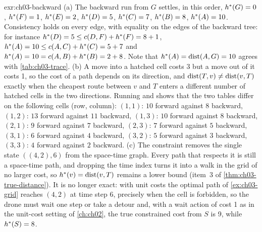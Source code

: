 \begin{solution}{exr:ch03-backward}
(a) The backward run from $G$ settles, in this order, $h^*(G)=0$, $h^*(F)=1$, $h^*(E)=2$, $h^*(D)=5$, $h^*(C)=7$, $h^*(B)=8$, $h^*(A)=10$. Consistency holds on every edge, with equality on the edges of the backward tree: for instance $h^*(D)=5\le c(D,F)+h^*(F)=8+1$, $h^*(A)=10\le c(A,C)+h^*(C)=5+7$ and $h^*(A)=10=c(A,B)+h^*(B)=2+8$. Note that $h^*(A)=\operatorname{dist}(A,G)=10$ agrees with \cref{tab:ch03-trace}. (b) A move into a hatched cell costs 3 but a move out of it costs 1, so the cost of a path depends on its direction, and $\operatorname{dist}(T,v)\neq\operatorname{dist}(v,T)$ exactly when the cheapest route between $v$ and $T$ enters a different number of hatched cells in the two directions. Running  and  shows that the two tables differ on the following cells (row, column): $(1,1)$: $10$ forward against $8$ backward, $(1,2)$: $13$ forward against $11$ backward, $(1,3)$: $10$ forward against $8$ backward, $(2,1)$: $9$ forward against $7$ backward, $(2,3)$: $7$ forward against $5$ backward, $(3,1)$: $6$ forward against $4$ backward, $(3,2)$: $5$ forward against $3$ backward, $(3,3)$: $4$ forward against $2$ backward. (c) The constraint removes the single state $((4,2),6)$ from the space-time graph. Every path that respects it is still a space-time path, and dropping the time index turns it into a walk in the grid of no larger cost, so $h^*(v)=\operatorname{dist}(v,T)$ remains a lower bound (item~3 of \cref{thm:ch03-true-distance}). It is no longer exact: with unit costs the optimal path of \cref{ex:ch03-grid} reaches $(4,2)$ at time step 6, precisely when the cell is forbidden, so the drone must wait one step or take a detour and, with a wait action of cost 1 as in the unit-cost setting of \cref{ch:ch02}, the true constrained cost from $S$ is 9, while $h^*(S)=8$.
\end{solution}

